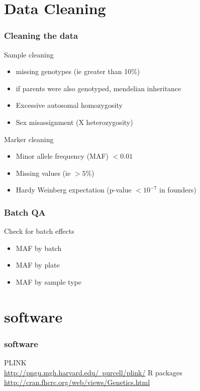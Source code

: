 \documentclass[pdf]{beamer}
\begin{document}
\section{Data Cleaning}
\begin{frame}
\frametitle{Cleaning the data}
Sample cleaning
\begin{itemize}
  \item missing genotypes (ie greater than 10\%)
  \item if parents were also genotyped, mendelian inheritance 
  \item Excessive autosomal homozygosity
  \item Sex misassignment (X heterozygosity)
\end{itemize}
Marker cleaning
\begin{itemize}
\item Minor allele frequency (MAF) $<0.01$
\item Missing values (ie $>5$\%)
\item Hardy Weinberg expectation (p-value $< 10^{-7}$ in founders)
\end{itemize}
\end{frame}  

\begin{frame}
\frametitle{Batch QA}
Check for batch effects
\begin{itemize}
\item MAF by batch
\item MAF by plate
\item MAF by sample type 
\end{itemize}
\end{frame}

\section{software}
\begin{frame}
\frametitle{software}
PLINK\\
\href{http://pngu.mgh.harvard.edu/~purcell/plink/}{http://pngu.mgh.harvard.edu/~purcell/plink/}
\vspace{0.3in}
R packages
\href{http://cran.fhcrc.org/web/views/Genetics.html}{http://cran.fhcrc.org/web/views/Genetics.html}
\end{frame}
\end{document}
